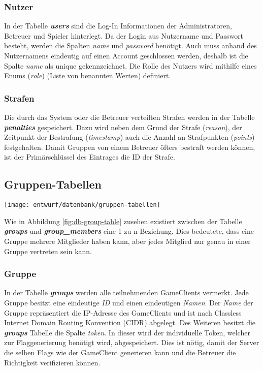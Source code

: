 \subsubsection{Nutzer}
In der Tabelle \textbf{\textit{users}} sind die Log-In Informationen der Administratoren, Betreuer und Spieler hinterlegt. Da der Login aus Nutzername und Passwort besteht, werden die Spalten \textit{name} und \textit{password} benötigt. Auch muss anhand des Nutzernamens eindeutig auf einen Account geschlossen werden, deshalb ist die Spalte \textit{name} als unique gekennzeichnet. Die Rolle des Nutzers wird mithilfe eines Enums (\textit{role}) (Liste von benannten Werten) definiert.

\subsubsection{Strafen}
Die durch das System oder die Betreuer verteilten Strafen werden in der Tabelle \textbf{\textit{penalties}} gespeichert. Dazu wird neben dem Grund der Strafe (\textit{reason}), der Zeitpunkt der Bestrafung (\textit{timestamp}) auch die Anzahl an Strafpunkten (\textit{points}) festgehalten. Damit Gruppen von einem Betreuer öfters bestraft werden können, ist der Primärschlüssel des Eintrages die ID der Strafe.

\subsection{Gruppen-Tabellen}
\begin{center}
	\texttt{[image: entwurf/datenbank/gruppen-tabellen]}
	\label{fig:db-group-table}
\end{center}

Wie in Abbildung \ref{fig:db-group-table} zusehen existiert zwischen der Tabelle \textbf{\textit{groups}} und \textbf{\textit{group\_members}} eine 1 zu n Beziehung. Dies bedeutete, dass eine Gruppe mehrere Mitglieder haben kann, aber jedes Mitglied nur genau in einer Gruppe vertreten sein kann.

\subsubsection{Gruppe}
In der Tabelle \textbf{\textit{groups}} werden alle teilnehmenden GameClients vermerkt. Jede Gruppe besitzt eine eindeutige \textit{ID} und einen eindeutigen \textit{Namen}. Der \textit{Name} der Gruppe repräsentiert die IP-Adresse des GameClients und ist nach Classless Internet Domain Routing Konvention (CIDR) abgelegt. Des Weiteren besitzt die \textbf{\textit{groups}} Tabelle die Spalte \textit{token}. In dieser wird der individuelle Token, welcher zur Flaggenerierung benötigt wird, abgespeichert. Dies ist nötig, damit der Server die selben Flags wie der GameClient generieren kann und die Betreuer die Richtigkeit verifizieren können.

